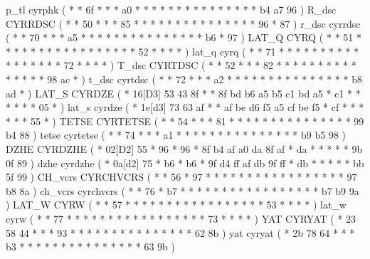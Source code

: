 \makecod p_tl         cyrphk            ( *  *       6f *   *  *  a0 *     *  *  *  *  *     *  *  *  *     *  *  *     *   *  b4   a7 96  )
%
\makeCOD R_dsc        CYRRDSC           ( *  *       50 *   *  *  85 *     *  *  *  *  *     *  *  *  *     *  *  *     *   *  96   *  87  )
\makecod r_dsc        cyrrdsc           ( *  *       70 *   *  *  a5 *     *  *  *  *  *     *  *  *  *     *  *  *     *   *  b6   *  97  )
\makeCOD LAT_Q        CYRQ              ( *  *       51 *   *  *  *  *     *  *  *  *  *     *  *  *  *     *  *  *     52  *  *    *  *   )
\makecod lat_q        cyrq              ( *  *       71 *   *  *  *  *     *  *  *  *  *     *  *  *  *     *  *  *     72  *  *    *  *   )
\makeCOD T_dsc        CYRTDSC           ( *  *       52 *   *  *  82 *     *  *  *  *  *     *  *  *  *     *  *  *     *   *  98   ac *   )
\makecod t_dsc        cyrtdsc           ( *  *       72 *   *  *  a2 *     *  *  *  *  *     *  *  *  *     *  *  *     *   *  b8   ad *   )
\makeCOD LAT_S        CYRDZE            ( *  16[D3]  53 43  8f *  *  8f    bd b6 a5 b5 c1    bd a5 *  c1    *  *  *     *   *  *    05 *   )
\makecod lat_s        cyrdze            ( *  1e[d3]  73 63  af *  *  af    be d6 f5 a5 cf    be f5 *  cf    *  *  *     *   *  *    55 *   )
\makeCOD TETSE        CYRTETSE          ( *  *       54 *   *  *  81 *     *  *  *  *  *     *  *  *  *     *  *  *     *   *  99   b4 88  )
\makecod tetse        cyrtetse          ( *  *       74 *   *  *  a1 *     *  *  *  *  *     *  *  *  *     *  *  *     *   *  b9   b5 98  )
\makeCOD DZHE         CYRDZHE           ( *  02[D2]  55 *   96 *  96 *     8f b4 af a0 da    8f af *  da    *  *  *     *   *  9b   0f 89  )
\makecod dzhe         cyrdzhe           ( *  0a[d2]  75 *   b6 *  b6 *     9f d4 ff af db    9f ff *  db    *  *  *     *   *  bb   5f 99  )
\makeCOD CH_vcrs      CYRCHVCRS         ( *  *       56 *   97 *  *  *     *  *  *  *  *     *  *  *  *     *  *  *     *   *  97   b8 8a  )
\makecod ch_vcrs      cyrchvcrs         ( *  *       76 *   b7 *  *  *     *  *  *  *  *     *  *  *  *     *  *  *     *   *  b7   b9 9a  )
\makeCOD LAT_W        CYRW              ( *  *       57 *   *  *  *  *     *  *  *  *  *     *  *  *  *     *  *  *     53  *  *    *  *   )
\makecod lat_w        cyrw              ( *  *       77 *   *  *  *  *     *  *  *  *  *     *  *  *  *     *  *  *     73  *  *    *  *   )
\makeCOD YAT          CYRYAT            ( *  23      58 44  *  *  *  93    *  *  *  *  *     *  *  *  *     *  *  *     *   *  *    62 8b  )
\makecod yat          cyryat            ( *  2b      78 64  *  *  *  b3    *  *  *  *  *     *  *  *  *     *  *  *     *   *  *    63 9b  )
